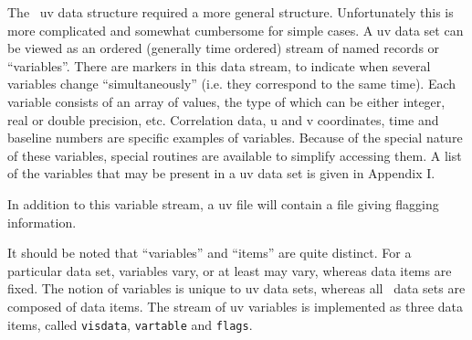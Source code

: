 \documentclass{report}
\begin{document}
The \miriad\ uv data structure required a more general structure. Unfortunately
this is more complicated and somewhat cumbersome for simple cases.
A uv data set can be viewed as an ordered (generally time ordered) stream of
named records or ``variables''. There are markers in this data stream, to
indicate when
several variables change ``simultaneously'' (i.e. they correspond to the
same time). Each variable
consists of an array of values, the type of which can be either integer, real
or double precision, etc. Correlation data, u and v coordinates,
time and baseline numbers are specific examples of variables.
Because of the special nature of these variables, special routines are
available to simplify accessing them. A list of the variables
that may be present in a uv data set is given in Appendix I.

In addition to this variable stream, a uv file will contain a file giving
flagging information.

It should be noted that ``variables'' and ``items''
are quite distinct. For a particular data set, variables vary, or at least may
vary,
whereas data items are fixed. The notion of variables is unique to uv data sets,
whereas all \miriad\ data sets are composed of data items. The stream of
uv variables is implemented as three data items, called {\tt visdata},
{\tt vartable} and {\tt flags}.
\end{document}
